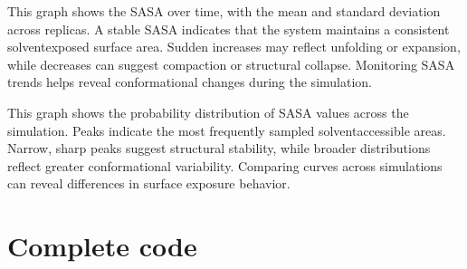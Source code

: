 \documentclass[a4paper,10pt,english]{sphinxmanual}
\let\sphinxpxdimen\pdfpxdimen\else\newdimen\sphinxpxdimen
\begin{document}
\noindent{}

\sphinxAtStartPar
{} This graph shows the SASA over time, with the mean and standard deviation across replicas. A stable SASA indicates that the system maintains a consistent solvent\sphinxhyphen{}exposed surface area. Sudden increases may reflect unfolding or expansion, while decreases can suggest compaction or structural collapse. Monitoring SASA trends helps reveal conformational changes during the simulation.

\begin{sphinxVerbatim}[commandchars=\\\{\}]
  
\end{sphinxVerbatim}

\noindent{\hspace*{\fill}\sphinxincludegraphics[width=500\sphinxpxdimen]{{SASA_density}.png}\hspace*{\fill}}

\sphinxAtStartPar
{} This graph shows the probability distribution of SASA values across the simulation. Peaks indicate the most frequently sampled solvent\sphinxhyphen{}accessible areas. Narrow, sharp peaks suggest structural stability, while broader distributions reflect greater conformational variability. Comparing curves across simulations can reveal differences in surface exposure behavior.


\section{Complete code}
\label{\detokenize{SASA:complete-code}}
\begin{sphinxVerbatim}[commandchars=\\\{\}]
 
\end{sphinxVerbatim}

\begin{sphinxVerbatim}[commandchars=\\\{\}]
\end{sphinxVerbatim}
\end{document}
